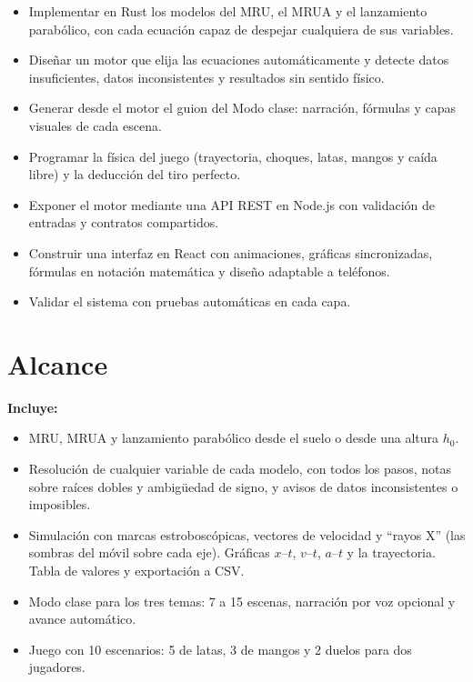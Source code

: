 \documentclass[11pt,letterpaper]{article}
\begin{document}
\begin{itemize}
  \item Implementar en Rust los modelos del MRU, el MRUA y el lanzamiento parabólico, con cada ecuación capaz de despejar cualquiera de sus variables.
  \item Diseñar un motor que elija las ecuaciones automáticamente y detecte datos insuficientes, datos inconsistentes y resultados sin sentido físico.
  \item Generar desde el motor el guion del Modo clase: narración, fórmulas y capas visuales de cada escena.
  \item Programar la física del juego (trayectoria, choques, latas, mangos y caída libre) y la deducción del tiro perfecto.
  \item Exponer el motor mediante una API REST en Node.js con validación de entradas y contratos compartidos.
  \item Construir una interfaz en React con animaciones, gráficas sincronizadas, fórmulas en notación matemática y diseño adaptable a teléfonos.
  \item Validar el sistema con pruebas automáticas en cada capa.
\end{itemize}

\section{Alcance}

\textbf{Incluye:}
\begin{itemize}
  \item MRU, MRUA y lanzamiento parabólico desde el suelo o desde una altura $h_0$.
  \item Resolución de cualquier variable de cada modelo, con todos los pasos, notas sobre raíces dobles y ambigüedad de signo, y avisos de datos inconsistentes o imposibles.
  \item Simulación con marcas estroboscópicas, vectores de velocidad y ``rayos X'' (las sombras del móvil sobre cada eje). Gráficas $x$–$t$, $v$–$t$, $a$–$t$ y la trayectoria. Tabla de valores y exportación a CSV.
  \item Modo clase para los tres temas: 7 a 15 escenas, narración por voz opcional y avance automático.
  \item Juego con 10 escenarios: 5 de latas, 3 de mangos y 2 duelos para dos jugadores.
\end{itemize}
\end{document}
